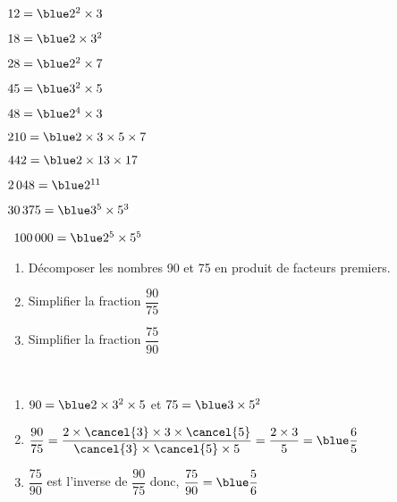 \begin{colonne*exercice}
\begin{corrige}
   \begin{colenumerate}{2}
      \item $12 =\blue 2^2\times3$
      \item $18 =\blue 2\times3^2$
      \item $28 =\blue 2^2\times7$
      \item $45 =\blue 3^2\times5$
      \item $48 =\blue 2^4\times3$
      \item $210 =\blue 2\times3\times5\times7$
      \item $442 =\blue 2\times13\times17$
      \item $2\,048 =\blue 2^{11}$
      \item $30\,375 =\blue 3^5\times5^3$
      \item \, $100\,000 =\blue 2^5\times5^5$
   \end{colenumerate}
\end{corrige}

\bigskip


  
\begin{exercice} %
   \begin{enumerate}
      \item Décomposer les nombres 90 et 75 en produit de facteurs premiers.
      \item Simplifier la fraction $\dfrac{90}{75}$ \medskip
      \item Simplifier la fraction $\dfrac{75}{90}$
   \end{enumerate}
\end{exercice}

\begin{corrige}
   \ \\ [-5mm]\begin{enumerate}
      \item $90 ={\blue 2\times3^2\times5}$ et $75 ={\blue 3\times5^2}$ \medskip
      \item $\dfrac{90}{75} =\dfrac{2\times\cancel{3}\times3\times\cancel{5}}{\cancel{3}\times\cancel{5}\times5} =\dfrac{2\times3}{5} ={\blue \dfrac65}$ \medskip
      \item $\dfrac{75}{90}$ est l'inverse de $\dfrac{90}{75}$ donc, $\dfrac{75}{90}={\blue \dfrac56}$
   \end{enumerate}
\end{corrige}

\bigskip



\end{colonne*exercice}
